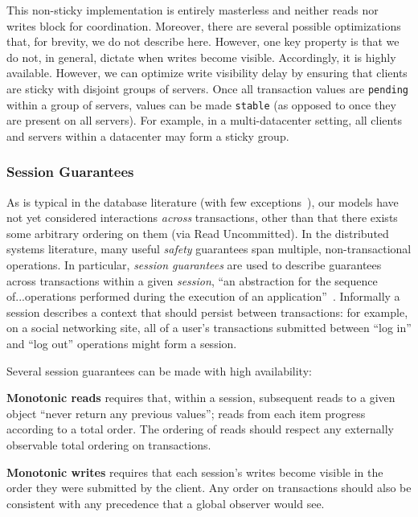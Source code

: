 This non-sticky implementation is entirely masterless and neither reads
nor writes block for coordination. Moreover, there are several
possible optimizations that, for brevity, we do not describe
here. However, one key property is that we do not, in general, dictate
when writes become visible. Accordingly, it is highly
available. However, we can optimize write visibility delay by ensuring
that clients are sticky with disjoint groups of servers. Once all
transaction values are \texttt{pending} within a group of servers,
values can be made \texttt{stable} (as opposed to once they are
present on all servers). For example, in a multi-datacenter setting,
all clients and servers within a datacenter may form a sticky group.


\subsubsection{Session Guarantees}

As is typical in the database literature (with few
exceptions~\cite{daudjee-session}), our models have not yet considered
interactions \textit{across} transactions, other than that there
exists some arbitrary ordering on them (via Read Uncommitted). In the
distributed systems literature, many useful \textit{safety} guarantees
span multiple, non-transactional operations. In particular,
\textit{session guarantees} are used to describe guarantees across
transactions within a given \textit{session}, ``an abstraction for the
sequence of...operations performed during the execution of an
application''~\cite{sessionguarantees}. Informally a session describes
a context that should persist between transactions: for example, on a
social networking site, all of a user's transactions submitted between
``log in'' and ``log out'' operations might form a session.

Several session guarantees can be made with high availability:

\vspace{.5em}\noindent\textbf{{Monotonic reads}} requires that, within
a session, subsequent reads to a given object ``never return any
previous values''; reads from each item progress according to a total
order. The ordering of reads should respect any externally observable
total ordering on transactions.

\vspace{.5em}\noindent\textbf{{Monotonic writes}} requires that each
session's writes become visible in the order they were submitted by
the client. Any order on transactions should also be consistent with
any precedence that a global observer would see.

